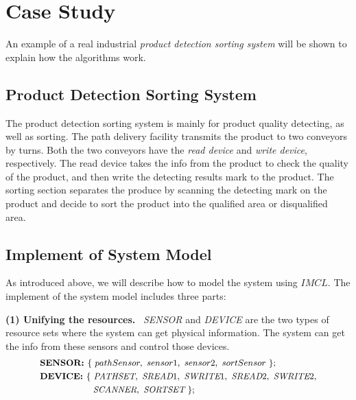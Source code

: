 \section{Case Study}
An example of a real industrial \emph{product detection sorting system} will be shown to explain how the algorithms work.

\subsection{Product Detection Sorting System}
The product detection sorting system is mainly for product quality detecting, as well as sorting. The path delivery facility transmits the product to two conveyors by turns. Both the two conveyors have the \emph{read device} and \emph{write device}, respectively. The read device takes the info from the product to check the quality of the product, and then write the detecting results mark to the product. The sorting section separates the produce by scanning the detecting mark on the product and decide to sort the product into the qualified area or disqualified area.


\subsection{Implement of System Model}
As introduced above, we will describe how to model the system using $IMCL$. The implement of the system model includes three parts:

\textbf{(1) Unifying the resources.} \ \emph{SENSOR} and \emph{DEVICE} are the two types of resource sets where the system can get physical information. The system can get the info from these sensors and control those devices.
\begin{equation*}
\footnotesize
    \begin{aligned}
       & \textbf{SENSOR: }  \{ \ pathSensor, \ sensor1, \ sensor2, \ sortSensor \ \}; \\
       & \textbf{DEVICE: }  \{ \ \emph{PATHSET}, \ \emph{SREAD}1, \ \emph{SWRITE}1, \ \emph{SREAD}2, \ \emph{SWRITE}2, \\
       & \ \ \ \ \ \ \ \ \ \ \ \ \ \ \ \ \ \ \emph{SCANNER}, \ \emph{SORTSET} \ \};
    \end{aligned}
\end{equation*}

